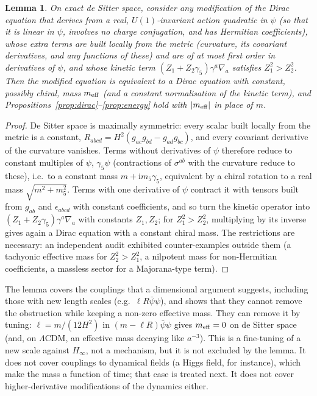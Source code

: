 \documentclass[11pt,a4paper]{article}
\newtheorem{lemma}{Lemma}
\theoremstyle{definition}
\newcommand{\ii}{\mathrm{i}}
\begin{document}
\begin{lemma}
\label{lem:coupling}
On exact de Sitter space, consider any modification of the Dirac equation that derives from a real, $U(1)$-invariant action quadratic in $\psi$ (so that it is linear in $\psi$, involves no charge conjugation, and has Hermitian coefficients), whose extra terms are built locally from the metric (curvature, its covariant derivatives, and any functions of these) and are of at most first order in derivatives of $\psi$, and whose kinetic term $(Z_{1}+Z_{2}\gamma_{5})\gamma^{a}\nabla_{a}$ satisfies $Z_{1}^{2}>Z_{2}^{2}$. Then the modified equation is equivalent to a Dirac equation with constant, possibly chiral, mass $m_{\rm eff}$ (and a constant normalisation of the kinetic term), and Propositions~\ref{prop:dirac}--\ref{prop:energy} hold with $|m_{\rm eff}|$ in place of $m$.
\end{lemma}
\begin{proof}
De Sitter space is maximally symmetric: every scalar built locally from the metric is a constant, $R_{abcd}=H^{2}(g_{ac}g_{bd}-g_{ad}g_{bc})$, and every covariant derivative of the curvature vanishes. Terms without derivatives of $\psi$ therefore reduce to constant multiples of $\psi$, $\gamma_{5}\psi$ (contractions of $\sigma^{ab}$ with the curvature reduce to these), i.e.\ to a constant mass $m+\ii m_{5}\gamma_{5}$, equivalent by a chiral rotation to a real mass $\sqrt{m^{2}+m_{5}^{2}}$. Terms with one derivative of $\psi$ contract it with tensors built from $g_{ab}$ and $\epsilon_{abcd}$ with constant coefficients, and so turn the kinetic operator into $(Z_{1}+Z_{2}\gamma_{5})\gamma^{a}\nabla_{a}$ with constants $Z_{1},Z_{2}$; for $Z_{1}^{2}>Z_{2}^{2}$, multiplying by its inverse gives again a Dirac equation with a constant chiral mass. The restrictions are necessary: an independent audit exhibited counter-examples outside them (a tachyonic effective mass for $Z_{2}^{2}>Z_{1}^{2}$, a nilpotent mass for non-Hermitian coefficients, a massless sector for a Majorana-type term).
\end{proof}

The lemma covers the couplings that a dimensional argument suggests, including those with new length scales (e.g.\ $\ell R\bar\psi\psi$), and shows that they cannot remove the obstruction while keeping a non-zero effective mass. They can remove it by tuning: $\ell=m/(12H^{2})$ in $(m-\ell R)\bar\psi\psi$ gives $m_{\rm eff}=0$ on de Sitter space (and, on $\Lambda$CDM, an effective mass decaying like $a^{-3}$). This is a fine-tuning of a new scale against $H_{\infty}$, not a mechanism, but it is not excluded by the lemma. It does not cover couplings to dynamical fields (a Higgs field, for instance), which make the mass a function of time; that case is treated next. It does not cover higher-derivative modifications of the dynamics either.
\end{document}
